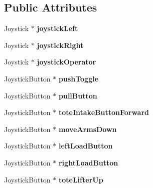 \subsection*{Public Attributes}
\begin{DoxyCompactItemize}
\item 
\hypertarget{class_o_i_a2bee2d865aa653e059b603ce820c26dc}{}Joystick $\ast$ {\bfseries joystick\+Left}\label{class_o_i_a2bee2d865aa653e059b603ce820c26dc}

\item 
\hypertarget{class_o_i_aaaafd946afb55b9d9404afe89a705fd5}{}Joystick $\ast$ {\bfseries joystick\+Right}\label{class_o_i_aaaafd946afb55b9d9404afe89a705fd5}

\item 
\hypertarget{class_o_i_a2fc95d5844f23524dd94f564eef2391b}{}Joystick $\ast$ {\bfseries joystick\+Operator}\label{class_o_i_a2fc95d5844f23524dd94f564eef2391b}

\item 
\hypertarget{class_o_i_adff52f1cc6091a586837550a05c77971}{}Joystick\+Button $\ast$ {\bfseries push\+Toggle}\label{class_o_i_adff52f1cc6091a586837550a05c77971}

\item 
\hypertarget{class_o_i_ab02cd0377621491441c4f7418ca10f62}{}Joystick\+Button $\ast$ {\bfseries pull\+Button}\label{class_o_i_ab02cd0377621491441c4f7418ca10f62}

\item 
\hypertarget{class_o_i_a7943df53f2f363fc651678f5e43aaa8c}{}Joystick\+Button $\ast$ {\bfseries tote\+Intake\+Button\+Forward}\label{class_o_i_a7943df53f2f363fc651678f5e43aaa8c}

\item 
\hypertarget{class_o_i_a5924e02ee1bf7b6c82c644e637b9bfce}{}Joystick\+Button $\ast$ {\bfseries move\+Arms\+Down}\label{class_o_i_a5924e02ee1bf7b6c82c644e637b9bfce}

\item 
\hypertarget{class_o_i_ab6757fb5ca25809e06d87890075fd6b4}{}Joystick\+Button $\ast$ {\bfseries left\+Load\+Button}\label{class_o_i_ab6757fb5ca25809e06d87890075fd6b4}

\item 
\hypertarget{class_o_i_a767feac46732443432a500c3a9b6c1f5}{}Joystick\+Button $\ast$ {\bfseries right\+Load\+Button}\label{class_o_i_a767feac46732443432a500c3a9b6c1f5}

\item 
\hypertarget{class_o_i_ae8d9bbb4b6fc16b8ff7a386b55795dcb}{}Joystick\+Button $\ast$ {\bfseries tote\+Lifter\+Up}\label{class_o_i_ae8d9bbb4b6fc16b8ff7a386b55795dcb}


\end{DoxyCompactItemize}
